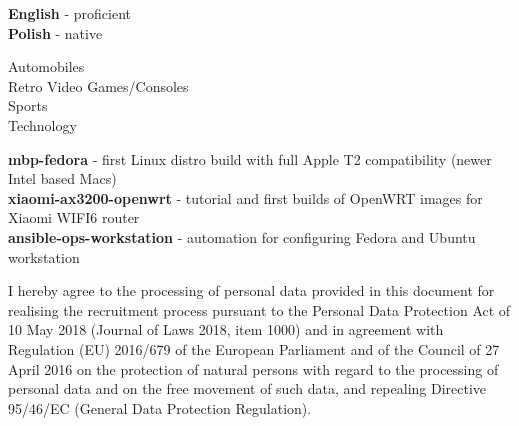 \documentclass[9pt]{style/developercv}
\begin{document}
\begin{minipage}[t]{0.3\textwidth}
	\vspace{-\baselineskip}


	\textbf{English} - proficient\\
	\textbf{Polish} - native
\end{minipage}
\hfill
\begin{minipage}[t]{0.3\textwidth}
	\vspace{-\baselineskip}


  Automobiles\\
  Retro Video Games/Consoles\\
  Sports\\
  Technology
\end{minipage}
\hfill
\begin{minipage}[t]{0.3\textwidth}
	\vspace{-\baselineskip}


  \textbf{mbp-fedora} - first Linux distro build with full Apple T2 compatibility (newer Intel based Macs)\\
  \textbf{xiaomi-ax3200-openwrt} - tutorial and first builds of OpenWRT images for Xiaomi WIFI6 router\\
  \textbf{ansible-ops-workstation} - automation for configuring Fedora and Ubuntu workstation
\end{minipage}




\vspace{1.00cm}

\begin{minipage}[t]{1\textwidth}
	I hereby agree to the processing of personal data provided in this document for
	realising the recruitment process pursuant to the Personal Data Protection Act
	of 10 May 2018 (Journal of Laws 2018, item 1000) and in agreement with Regulation (EU)
	2016/679 of the European Parliament and of the Council of 27 April 2016 on the
	protection of natural persons with regard to the processing of personal data and on
	the free movement of such data, and repealing Directive 95/46/EC (General Data
	Protection Regulation).
\end{minipage}
\end{document}
